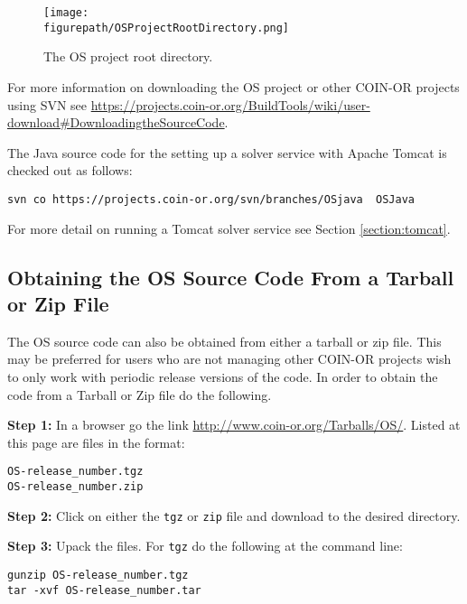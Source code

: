 \documentclass[11pt]{article}
\newcommand{\figurepath}{./figures}
\renewcommand{\_}{{\char"5F}}
\renewcommand{\{}{{\char"7B}}
\renewcommand{\}}{{\char"7D}}
\renewcommand{\^}{{\char"0D}}
\renewcommand{\'}{{\char"0D}}
\begin{document}
\begin{figure}
\centering
\texttt{[image: \\figurepath/OSProjectRootDirectory.png]}
\caption{The OS project root directory.}
\label{figure:osprojectrootdir}
\end{figure}

For more information on downloading the OS project or other COIN-OR projects using SVN see \url{https://projects.coin-or.org/BuildTools/wiki/user-download#DownloadingtheSourceCode}.

The Java source code for the setting up a solver service with Apache Tomcat is checked out as follows:
\begin{verbatim}
svn co https://projects.coin-or.org/svn/branches/OSjava  OSJava
\end{verbatim}
For more detail on running a Tomcat solver service  see  Section \ref{section:tomcat}.








\subsection{Obtaining the OS Source Code From a Tarball or Zip File}\label{section:getTarBalls}

The OS source code can also be obtained from either a  tarball or zip file.  This may be preferred for users who are not managing other COIN-OR projects wish to only work with periodic release versions of the code.  In order to obtain the code from a Tarball or Zip file do the following.

\vskip 8pt

{\bf Step 1:} In a browser go the link \url{http://www.coin-or.org/Tarballs/OS/}.  Listed at this page are files in the format:

\begin{verbatim}
OS-release_number.tgz
OS-release_number.zip
\end{verbatim}

\vskip 8pt

{\bf Step 2:} Click on either the {\tt tgz} or {\tt zip} file and download to the desired directory.

\vskip 8pt

{\bf Step 3:} Upack the files. For {\tt tgz} do the following at the command line:
\begin{verbatim}
gunzip OS-release_number.tgz
tar -xvf OS-release_number.tar
\end{verbatim}
\end{document}
